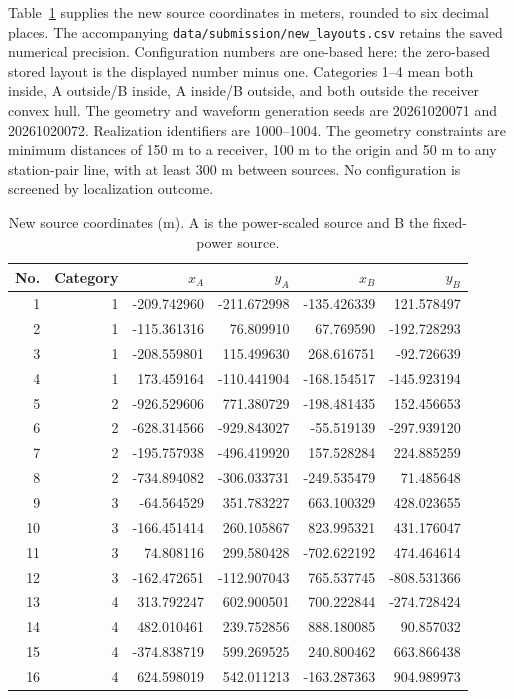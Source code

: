 \documentclass[a4paper,12pt,review]{cas-sc}
\begin{document}
Table~\ref{sup:coordinates} supplies the new source coordinates in meters, rounded to six decimal places. The accompanying \texttt{data/submission/new\_layouts.csv} retains the saved numerical precision. Configuration numbers are one-based here: the zero-based stored layout is the displayed number minus one. Categories 1--4 mean both inside, A outside/B inside, A inside/B outside, and both outside the receiver convex hull. The geometry and waveform generation seeds are 20261020071 and 20261020072. Realization identifiers are 1000--1004. The geometry constraints are minimum distances of 150 m to a receiver, 100 m to the origin and 50 m to any station-pair line, with at least 300 m between sources. No configuration is screened by localization outcome.
\begin{table}[pos=H]\centering\small
\caption{New source coordinates (m). A is the power-scaled source and B the fixed-power source.}\label{sup:coordinates}
\begin{tabular}{@{}rrrrrr@{}}\toprule
No. & Category & $x_A$ & $y_A$ & $x_B$ & $y_B$\\\midrule
1 & 1 & -209.742960 & -211.672998 & -135.426339 & 121.578497\\
2 & 1 & -115.361316 & 76.809910 & 67.769590 & -192.728293\\
3 & 1 & -208.559801 & 115.499630 & 268.616751 & -92.726639\\
4 & 1 & 173.459164 & -110.441904 & -168.154517 & -145.923194\\
5 & 2 & -926.529606 & 771.380729 & -198.481435 & 152.456653\\
6 & 2 & -628.314566 & -929.843027 & -55.519139 & -297.939120\\
7 & 2 & -195.757938 & -496.419920 & 157.528284 & 224.885259\\
8 & 2 & -734.894082 & -306.033731 & -249.535479 & 71.485648\\
9 & 3 & -64.564529 & 351.783227 & 663.100329 & 428.023655\\
10 & 3 & -166.451414 & 260.105867 & 823.995321 & 431.176047\\
11 & 3 & 74.808116 & 299.580428 & -702.622192 & 474.464614\\
12 & 3 & -162.472651 & -112.907043 & 765.537745 & -808.531366\\
13 & 4 & 313.792247 & 602.900501 & 700.222844 & -274.728424\\
14 & 4 & 482.010461 & 239.752856 & 888.180085 & 90.857032\\
15 & 4 & -374.838719 & 599.269525 & 240.800462 & 663.866438\\
16 & 4 & 624.598019 & 542.011213 & -163.287363 & 904.989973\\\bottomrule
\end{tabular}\end{table}
\FloatBarrier
\end{document}
